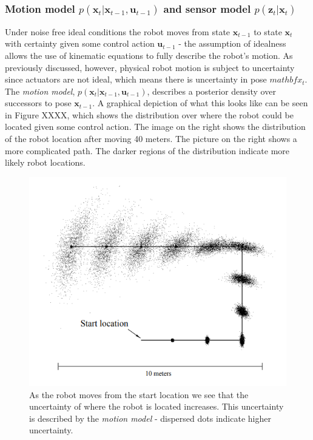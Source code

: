 \documentclass[a4paper]{article}
\begin{document}
\subsubsection{Motion model $p(\mathbf{x}_t| \mathbf{x}_{t-1}, \mathbf{u}_{t-1})$ and sensor model $p(\mathbf{z}_t|\mathbf{x}_t)$}
Under noise free ideal conditions the robot moves from state $\mathbf{x}_{t-1}$ to state $\mathbf{x}_t$ with certainty given some control action $\mathbf{u}_{t-1}$ - the assumption of idealness allows the use of kinematic equations to fully describe the robot's motion. As previously discussed, however, physical robot motion is subject to uncertainty since actuators are not ideal, which means there is uncertainty in pose $mathbf{x}_{t}$. The \textit{motion model}, $p(\mathbf{x}_t| \mathbf{x}_{t-1}, \mathbf{u}_{t-1})$, describes a posterior density over successors to pose $\mathbf{x}_{t-1}$. A graphical depiction of what this looks like can be seen in Figure XXXX, which shows the distribution over where the robot could be located given some control action. The image on the right shows the distribution of the robot location after moving 40 meters. The picture on the right shows a more complicated path. The darker regions of the distribution indicate more likely robot locations. 

\begin{figure}[h]
\centering
\includegraphics[scale=0.4]{motion_model}
\caption{As the robot moves from the start location we see that the uncertainty of where the robot is located increases. This uncertainty is described by the \textit{motion model} - dispersed dots indicate higher uncertainty.}
\end{figure}
\end{document}
